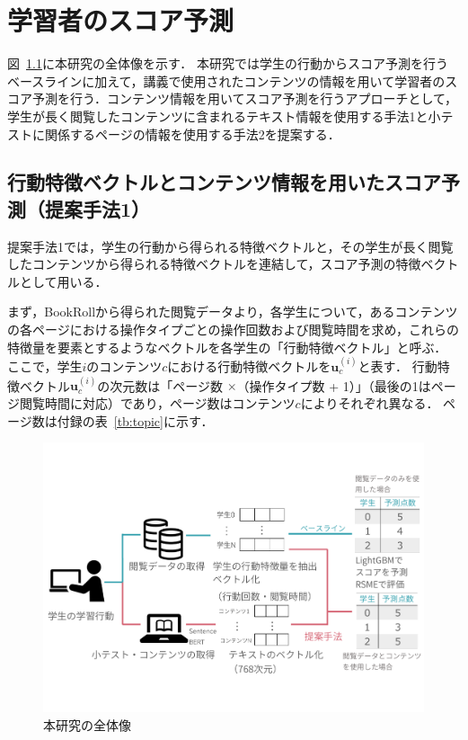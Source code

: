\documentclass[a4paper,12pt]{ltjsreport}
\begin{document}
\chapter{学習者のスコア予測}

図~\ref{fig:overview}に本研究の全体像を示す．
本研究では学生の行動からスコア予測を行うベースラインに加えて，講義で使用されたコンテンツの情報を用いて学習者のスコア予測を行う．コンテンツ情報を用いてスコア予測を行うアプローチとして，学生が長く閲覧したコンテンツに含まれるテキスト情報を使用する手法1と小テストに関係するページの情報を使用する手法2を提案する．

\section{行動特徴ベクトルとコンテンツ情報を用いたスコア予測（提案手法1）}\label{sec:1}

提案手法1では，学生の行動から得られる特徴ベクトルと，その学生が長く閲覧したコンテンツから得られる特徴ベクトルを連結して，スコア予測の特徴ベクトルとして用いる．

まず，BookRollから得られた閲覧データより，各学生について，あるコンテンツの各ページにおける操作タイプごとの操作回数および閲覧時間を求め，これらの特徴量を要素とするようなベクトルを各学生の「行動特徴ベクトル」と呼ぶ．
ここで，学生$i$のコンテンツ$c$における行動特徴ベクトルを$\bm{u}^{(i)}_c$と表す．
行動特徴ベクトル$\bm{u}^{(i)}_c$の次元数は「ページ数 $\times$（操作タイプ数 + 1）」（最後の1はページ閲覧時間に対応）であり，ページ数はコンテンツ$c$によりそれぞれ異なる．
ページ数は付録の表~\ref{tb:topic}に示す．

\begin{figure}[tbp]
  \centering
  \includegraphics[scale = 0.4]{zentaizo2n.pdf}
  \caption{本研究の全体像}
  \label{fig:overview}
\end{figure}
\end{document}
